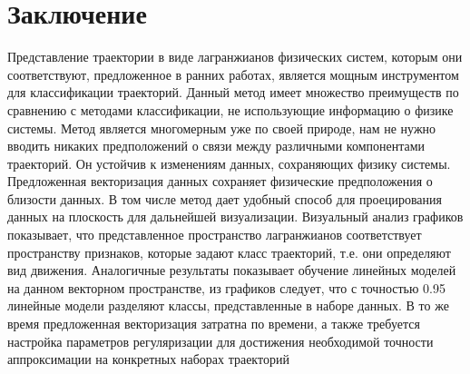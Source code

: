 \documentclass[12pt, twoside]{article}
\begin{document}
\newpage
\section{Заключение}

Представление траектории в виде лагранжианов физических систем, которым они соответствуют, предложенное в ранних работах, является мощным инструментом для классификации траекторий. Данный метод имеет множество преимуществ по сравнению с методами классификации, не использующие информацию о физике системы. Метод является многомерным уже по своей природе, нам не нужно вводить никаких предположений о связи между различными компонентами траекторий. Он устойчив к изменениям данных, сохраняющих физику системы. Предложенная векторизация данных сохраняет физические предположения о близости данных. В том числе метод дает удобный способ для проецирования данных на плоскость для дальнейшей визуализации. Визуальный анализ графиков показывает, что представленное пространство лагранжианов соответствует пространству признаков, которые задают класс траекторий, т.е. они определяют вид движения. Аналогичные результаты показывает обучение линейных моделей на данном векторном пространстве, из графиков следует, что с точностью 0.95 линейные модели разделяют классы, представленные в наборе данных.  В то же время предложенная векторизация затратна по времени, а также требуется настройка параметров регуляризации для достижения необходимой точности аппроксимации на конкретных наборах траекторий

\newpage
\end{document}

